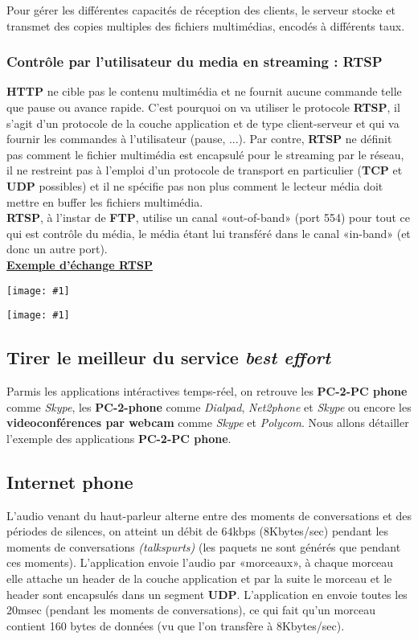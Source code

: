 \documentclass{article}
\newcommand{\imgR}[2]{\begin{center}\texttt{[image: \#1]}\end{center}}
\newcommand{\stitre}[1]{\noindent\textbf{\underline{#1}} \\}
\begin{document}
\noindent Pour gérer les différentes capacités de réception des clients, le serveur stocke et transmet des 
copies multiples des fichiers multimédias, encodés à différents taux.

\newpage

\subsubsection{Contrôle par l'utilisateur du media en streaming : RTSP}

\textbf{HTTP} ne cible pas le contenu multimédia et ne fournit aucune commande telle que pause ou avance rapide. 
C'est pourquoi on va utiliser le protocole \textbf{RTSP}, il s'agit d'un protocole de la couche application et de 
type client-serveur et qui va fournir les commandes à l'utilisateur (pause, ...). Par contre, \textbf{RTSP} ne 
définit pas comment le fichier multimédia est encapsulé pour le streaming par le réseau, il ne restreint pas à 
l'emploi d'un protocole de transport en particulier (\textbf{TCP} et \textbf{UDP} possibles) et il ne spécifie 
pas non plus comment le lecteur média doit mettre en buffer les fichiers multimédia. \\
\textbf{RTSP}, à l'instar de \textbf{FTP}, utilise un canal «out-of-band» (port 554) pour tout ce qui est 
contrôle du média, le média étant lui transféré dans le canal «in-band» (et donc un autre port). \\

\stitre{Exemple d'échange RTSP}

\imgR{CN_175.png}{400}
\imgR{CN_176.png}{400}

\subsection{Tirer le meilleur du service \textit{best effort}}

Parmis les applications intéractives temps-réel, on retrouve les \textbf{PC-2-PC phone} comme \textit{Skype}, les
\textbf{PC-2-phone} comme \textit{Dialpad}, \textit{Net2phone} et \textit{Skype} ou encore les 
\textbf{videoconférences par webcam} comme \textit{Skype} et \textit{Polycom}. Nous allons détailler l'exemple 
des applications \textbf{PC-2-PC phone}.

\subsection{Internet phone}

L'audio venant du haut-parleur alterne entre des moments de conversations et des périodes de silences, on atteint 
un débit de $64$kbps (8Kbytes/sec) pendant les moments de conversations \textit{(talkspurts)} (les paquets ne 
sont générés que pendant ces moments). L'application envoie l'audio par «morceaux», à chaque morceau elle attache 
un header de la couche application et par la suite le morceau et le header sont encapsulés dans un segment 
\textbf{UDP}. L'application en envoie toutes les $20$msec (pendant les moments de conversations), ce qui fait 
qu'un morceau contient 160 bytes de données (vu que l'on transfère à 8Kbytes/sec). \\
\end{document}
